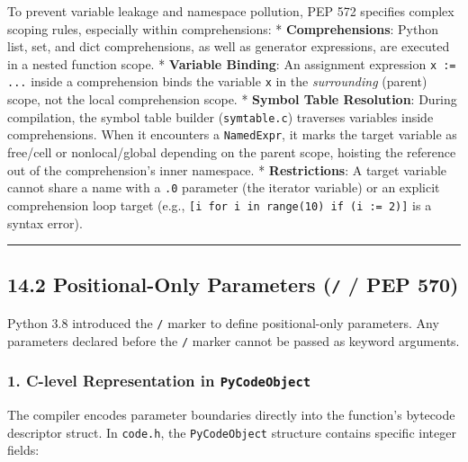 To prevent variable leakage and namespace pollution, PEP 572 specifies
complex scoping rules, especially within comprehensions: *
\textbf{Comprehensions}: Python list, set, and dict comprehensions, as
well as generator expressions, are executed in a nested function scope.
* \textbf{Variable Binding}: An assignment expression
\passthrough{\lstinline!x := ...!} inside a comprehension binds the
variable \passthrough{\lstinline!x!} in the \emph{surrounding} (parent)
scope, not the local comprehension scope. * \textbf{Symbol Table
Resolution}: During compilation, the symbol table builder
(\passthrough{\lstinline!symtable.c!}) traverses variables inside
comprehensions. When it encounters a
\passthrough{\lstinline!NamedExpr!}, it marks the target variable as
free/cell or nonlocal/global depending on the parent scope, hoisting the
reference out of the comprehension's inner namespace. *
\textbf{Restrictions}: A target variable cannot share a name with a
\passthrough{\lstinline!.0!} parameter (the iterator variable) or an
explicit comprehension loop target (e.g.,
\passthrough{\lstinline![i for i in range(10) if (i := 2)]!} is a syntax
error).

\begin{center}\rule{0.5\linewidth}{0.5pt}\end{center}

\hypertarget{positional-only-parameters-pep-570}{%
\subsection{\texorpdfstring{14.2 Positional-Only Parameters (\texttt{/}
/ PEP
570)}{14.2 Positional-Only Parameters (/ / PEP 570)}}\label{positional-only-parameters-pep-570}}

Python 3.8 introduced the \passthrough{\lstinline!/!} marker to define
positional-only parameters. Any parameters declared before the
\passthrough{\lstinline!/!} marker cannot be passed as keyword
arguments.

\hypertarget{c-level-representation-in-pycodeobject}{%
\subsubsection{\texorpdfstring{1. C-level Representation in
\texttt{PyCodeObject}}{1. C-level Representation in PyCodeObject}}\label{c-level-representation-in-pycodeobject}}

The compiler encodes parameter boundaries directly into the function's
bytecode descriptor struct. In \passthrough{\lstinline!code.h!}, the
\passthrough{\lstinline!PyCodeObject!} structure contains specific
integer fields:

